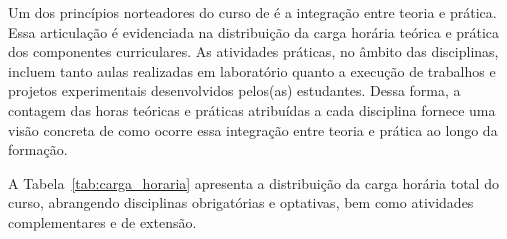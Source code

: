 Um dos princípios norteadores do curso de \nomedocurso é a integração entre teoria e prática. Essa articulação é evidenciada na distribuição da carga horária teórica e prática dos componentes curriculares. As atividades práticas, no âmbito das disciplinas, incluem tanto aulas realizadas em laboratório quanto a execução de trabalhos e projetos experimentais desenvolvidos pelos(as) estudantes. Dessa forma, a contagem das horas teóricas e práticas atribuídas a cada disciplina fornece uma visão concreta de como ocorre essa integração entre teoria e prática ao longo da formação.


\clearpage

A Tabela~\ref{tab:carga_horaria} apresenta a distribuição da carga horária total do curso, abrangendo disciplinas obrigatórias e optativas, bem como atividades complementares e de extensão. %

\def\ufcCHObrigatoria{2.144h\xspace}
\def\ufcCHTeorica{1.536h\xspace}
\def\ufcCHPratica{576h\xspace}
\def\ufcCHEAD{0h\xspace}
\def\ufcCHExtensao{32h\xspace}
\def\ufcHorExtensao{288h\xspace}

